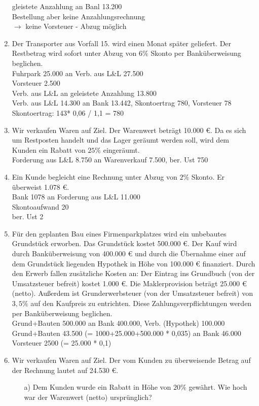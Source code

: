 \documentclass[paper=a4, fontsize=11pt]{scrartcl}
\numberwithin{equation}{section}
\numberwithin{figure}{section}
\numberwithin{table}{section}
\begin{document}
\begin{enumerate}
gleistete Anzahlung an Banl 13.200 \\
Bestellung aber keine Anzahlungsrechnung \\
$\rightarrow$ keine Vorsteuer - Abzug möglich
\item Der Transporter aus Vorfall 15. wird einen Monat später geliefert. Der Restbetrag wird sofort unter Abzug von $6 \%$ Skonto per Banküberweisung beglichen. \\

Fuhrpark 25.000 an Verb. aus L\&L 27.500 \\
Vorsteuer 2.500 \\
Verb. aus L\&L an geleistete Anzahlung 13.800 \\
Verb. aus L\&L 14.300 an Bank 13.442, Skontoertrag 780, Vorsteuer 78 \\
Skontoertrag: 143* 0,06 / 1,1 = 780

\item Wir verkaufen Waren auf Ziel. Der Warenwert beträgt 10.000 €. Da es sich um Restposten handelt und das Lager geräumt werden soll, wird dem Kunden ein Rabatt von $25 \%$ eingeräumt. \\

Forderung aus L\&L 8.750 an Warenverkauf 7.500, ber. Ust 750
\item Ein Kunde begleicht eine Rechnung unter Abzug von $2 \%$ Skonto. Er überweist 1.078 €.  \\

Bank 1078 an Forderung aus L\&L 11.000 \\
Skontoaufwand 20 \\
ber. Ust 2
\item Für den geplanten Bau eines Firmenparkplatzes wird ein unbebautes Grundstück erworben. Das Grundstück kostet 500.000 €. Der Kauf wird durch Banküberweisung von 400.000 € und durch die Übernahme einer auf dem Grundstück liegenden Hypothek in Höhe von 100.000 € finanziert. Durch den Erwerb fallen zusätzliche Kosten an: Der Eintrag ins Grundbuch (von der Umsatzsteuer befreit) kostet 1.000 €. Die Maklerprovision beträgt 25.000 € (netto). Außerdem ist Grunderwerbsteuer (von der Umsatzsteuer befreit) von $3,5 \%$ auf den Kaufpreis zu entrichten. Diese Zahlungsverpflichtungen werden per Banküberweisung beglichen. \\

Grund+Bauten 500.000 an Bank 400.000, Verb. (Hypothek) 100.000 \\
Grund+Bauten 43.500 (= 1000+25.000+500.000 * 0,035)  an Bank 46.000 \\
Vorsteuer 2500 (= 25.000 * 0,1)
\item Wir verkaufen Waren auf Ziel. Der vom Kunden zu überweisende Betrag auf der Rechnung lautet auf 24.530 €. \\
\begin{itemize}
\item[a)] Dem Kunden wurde ein Rabatt in Höhe von $20 \%$ gewährt. Wie hoch war der Warenwert (netto) ursprünglich? \\


\end{itemize}
\end{enumerate}
\end{document}
